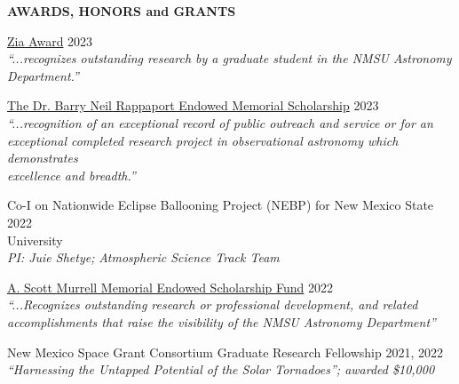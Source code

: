 \documentclass{resume} %
\begin{document}
\vspace{-0.1in}
\begin{rSection}{\textbf{AWARDS, HONORS and GRANTS}}
\vspace{0.02in}

{\href{https://astro.nmsu.edu/fellowships/zia.html}{Zia Award}}
\hfill{2023} \\
\emph{``...recognizes outstanding research by a graduate student in the NMSU Astronomy \\ Department.''}


{\href{https://astro.nmsu.edu/fellowships/rappaport.html}{The Dr. Barry Neil Rappaport Endowed Memorial Scholarship}}
\hfill{2023} \\
\emph{``...recognition of an exceptional record of public outreach and service or for an \\ exceptional completed research project in observational astronomy which demonstrates \\ excellence and breadth.''}

{Co-I on Nationwide Eclipse Ballooning Project (NEBP) for New Mexico State \hfill{2022} \\ University} \\
\emph{PI: Juie Shetye;} \emph{Atmospheric Science Track Team}

{\href{https://astro.nmsu.edu/fellowships/murrell.html}{A. Scott Murrell Memorial Endowed Scholarship Fund}}
\hfill{2022} \\
\emph{``...Recognizes outstanding research or professional development, and related \\ accomplishments that raise the visibility of the NMSU Astronomy Department''}

{New Mexico Space Grant Consortium Graduate Research Fellowship } \hfill{2021, 2022} \\
\emph{``Harnessing the Untapped Potential of the Solar Tornadoes''; awarded \$10,000}
\end{rSection}
\end{document}
